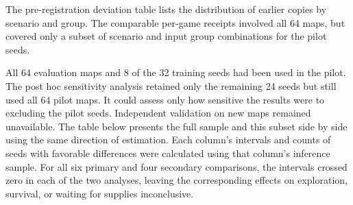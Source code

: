 \documentclass{article}
\begin{document}
The pre-registration deviation table lists the distribution of earlier copies by scenario and group. The comparable per-game receipts involved all 64 maps, but covered only a subset of scenario and input group combinations for the pilot seeds.


All 64 evaluation maps and 8 of the 32 training seeds had been used in the pilot. The post hoc sensitivity analysis retained only the remaining 24 seeds but still used all 64 pilot maps. It could assess only how sensitive the results were to excluding the pilot seeds. Independent validation on new maps remained unavailable. The table below presents the full sample and this subset side by side using the same direction of estimation. Each column's intervals and counts of seeds with favorable differences were calculated using that column's inference sample. For all six primary and four secondary comparisons, the intervals crossed zero in each of the two analyses, leaving the corresponding effects on exploration, survival, or waiting for supplies inconclusive.
\end{document}
